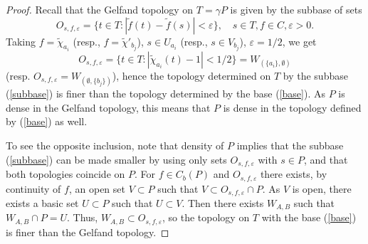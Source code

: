 \documentclass[10pt,a4paper]{amsart}
\newcommand{\e}{\varepsilon}
\newcommand{\til}{\widetilde}
\begin{document}
\begin{proof}
Recall that the Gelfand topology on $T=\gamma P$ is given by the subbase of sets 
\begin{equation}\label{subbase}
O_{s,f,\e}=\{t\in T:|\til f(t)-\til f(s)|<\e\}, \quad s\in T, f\in C, \e>0.
\end{equation}
Taking $f=\til\chi_{a_i}$ (resp., $f=\til\chi'_{b_j}$), $s\in U_{a_i}$ (resp., $s\in V_{b_j}$), $\e=1/2$, we get 
$$
O_{s,f,\e}=\{t\in T:|\til\chi_{a_i}(t)-1|<1/2\}=W_{(\{a_i\},\emptyset)}
$$ 
(resp. $O_{s,f,\e}=W_{(\emptyset,\{b_j\})}$), hence the topology determined on $T$ by the subbase (\ref{subbase}) is finer than the topology determined by the base (\ref{base}). As $P$ is dense in the Gelfand topology, this means that $P$ is dense in the topology defined by (\ref{base}) as well.  

To see the opposite inclusion, note that density of $P$ implies that the subbase (\ref{subbase}) can be made smaller by using only sets $O_{s,f,\e}$ with $s\in P$, and that both topologies coincide on $P$. For $f\in C_b(P)$ and $O_{s,f,\e}$ there exists, by continuity of $f$, an open set $V\subset P$ such that $V\subset O_{s,f,\e}\cap P$. As $V$ is open, there exists a basic set $U\subset P$ such that $U\subset V$. Then there exists $W_{A,B}$ such that $W_{A,B}\cap P=U$. Thus, $W_{A,B}\subset O_{s,f,\e}$, so the topology on $T$ with the base (\ref{base}) is finer than the Gelfand topology.  
\end{proof}
\end{document}
